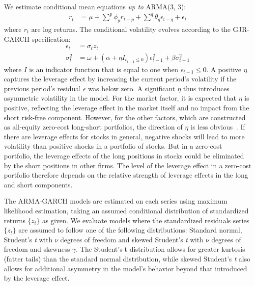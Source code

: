 We estimate conditional mean equations \emph{up to} ARMA(3, 3):
\begin{align}
  r_t &=
    \mu +
    \sum^p \phi_p r_{t - p} +
    \sum^q \theta_q \epsilon_{t - q} + 
    \epsilon_t
\end{align}
where $r_t$ are log returns. The conditional volatility evolves according to the GJR-GARCH specification:
\begin{align}
  \epsilon_t &= \sigma_t z_t \\
  \sigma_t^2 &=
    \omega +
    (\alpha + \eta I_{\epsilon_{t-1} \leq 0}) \epsilon_{t - 1}^2 +
    \beta \sigma^2_{t - 1}
\end{align}
where $I$ is an indicator function that is equal to one when $\epsilon_{t-1} \leq 0$. A positive $\eta$ captures the leverage effect by increasing the current period's volatility if the previous period's residual $\epsilon$ was below zero. A significant $\eta$ thus introduces asymmetric volatility in the model. For the market factor, it is expected that $\eta$ is positive, reflecting the leverage effect in the market itself and no impact from the short risk-free component. However, for the other factors, which are constructed as all-equity zero-cost long-short portfolios, the direction of $\eta$ is less obvious~\autocite{ChristoffersenLanglois2013}. If there are leverage effects for stocks in general, negative shocks will lead to more volatility than positive shocks in a portfolio of stocks. But in a zero-cost portfolio, the leverage effects of the long positions in stocks could be eliminated by the short positions in other firms. The level of the leverage effect in a zero-cost portfolio therefore depends on the relative strength of leverage effects in the long and short components.

The ARMA-GARCH models are estimated on each series using maximum likelihood estimation, taking an assumed conditional distribution of standardized returns $\{z_t\}$ as given. We evaluate models where the standardized residuals series $\{z_t\}$ are assumed to follow one of the following distributions: Standard normal, Student's \textit{t} with $\nu$ degrees of freedom and skewed Student's \textit{t} with $\nu$ degrees of freedom and skewness $\gamma$. The Student's t distribution allows for greater kurtosis (fatter tails) than the standard normal distribution, while skewed Student's \textit{t} also allows for additional asymmetry in the model's behavior beyond that introduced by the leverage effect.


